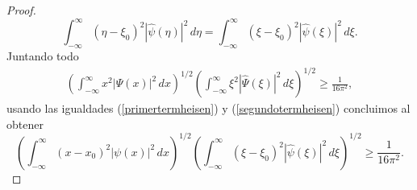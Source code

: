 \documentclass[12pt]{article}
\theoremstyle{plain}
\theoremstyle{definition}
\numberwithin{equation}{section}
\begin{document}
\begin{proof}
            \begin{equation}
                \label{segundotermheisen}
                \int_{-\infty}^{\infty} (\eta-\xi_0)^2 \left\lvert \hat{\psi}(\eta) \right\rvert^2 \,d\eta = \int_{-\infty}^{\infty} (\xi-\xi_0)^2 \left\lvert \hat{\psi}(\xi) \right\rvert^2\,d\xi .
            \end{equation}
            Juntando todo
            \begin{align*}
                \left( \int_{-\infty}^{\infty} x^2 \left\lvert \Psi(x) \right\rvert^2 \,dx \right)^{1/2} \left( \int_{-\infty}^{\infty} \xi^2 \left\lvert \widehat{\Psi}(\xi) \right\rvert^2 \,d\xi \right)^{1/2} \ge \frac{1}{16\pi^2},
            \end{align*}
            usando las igualdades (\ref{primertermheisen}) y (\ref{segundotermheisen}) concluimos al obtener $$ \left( \int_{-\infty}^{\infty} (x-x_0)^2 \left\lvert \psi(x) \right\rvert^2 \,dx \right)^{1/2} \left( \int_{-\infty}^{\infty} (\xi-\xi_0)^2 \left\lvert \hat{\psi}(\xi) \right\rvert^2 \,d\xi \right)^{1/2} \ge \frac{1}{16\pi^2}. $$
        \end{proof}
        \newpage
\appendix
\end{document}
